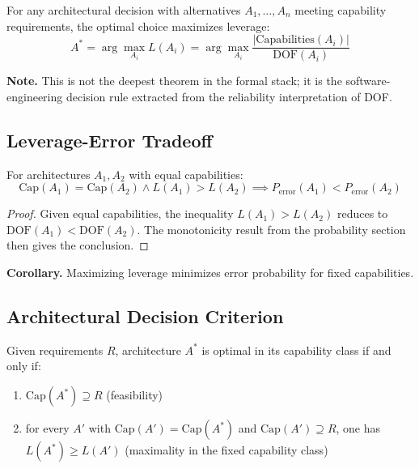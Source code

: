 \begin{theorem}\label{thm:leverage-max}
For any architectural decision with alternatives $A_1, \ldots, A_n$ meeting capability requirements, the optimal choice maximizes leverage:
\[
A^* = \arg\max_{A_i} L(A_i) = \arg\max_{A_i} \frac{|\mathrm{Capabilities}(A_i)|}{\mathrm{DOF}(A_i)}
\]
\end{theorem}

\textbf{Note.} This is not the deepest theorem in the formal stack; it is the software-engineering decision rule extracted from the reliability interpretation of DOF.

\subsection{Leverage-Error Tradeoff}

\begin{theorem}\label{thm:leverage-error}
For architectures $A_1, A_2$ with equal capabilities:
\[
\mathrm{Cap}(A_1) = \mathrm{Cap}(A_2) \wedge L(A_1) > L(A_2) \implies P_{\mathrm{error}}(A_1) < P_{\mathrm{error}}(A_2)
\]
\end{theorem}

\begin{proof}
Given equal capabilities, the inequality $L(A_1) > L(A_2)$ reduces to $\mathrm{DOF}(A_1) < \mathrm{DOF}(A_2)$. The monotonicity result from the probability section then gives the conclusion.
\end{proof}

\textbf{Corollary.} Maximizing leverage minimizes error probability for fixed capabilities.

\subsection{Architectural Decision Criterion}

\begin{theorem}\label{thm:optimal}
Given requirements $R$, architecture $A^*$ is optimal in its capability class if and only if:
\begin{enumerate}
\item $\mathrm{Cap}(A^*) \supseteq R$ (feasibility)
\item for every $A'$ with $\mathrm{Cap}(A') = \mathrm{Cap}(A^*)$ and $\mathrm{Cap}(A') \supseteq R$, one has $L(A^*) \geq L(A')$ (maximality in the fixed capability class)
\end{enumerate}
\end{theorem}

